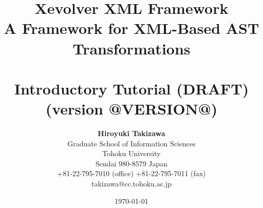 \documentclass[10pt]{book}
\begin{document}
\title{ {\bf {Xevolver XML Framework}}\\
A Framework for XML-Based AST Transformations \\
~\\
\bf{Introductory Tutorial (DRAFT)} \\
{(version @VERSION@)}}

\author{ {\bf Hiroyuki Takizawa} \\
Graduate School of Information Sciences\\
Tohoku University\\
Sendai 980-8579 Japan\\
+81-22-795-7010 (office)  +81-22-795-7011 (fax) \\
takizawa@cc.tohoku.ac.jp
       }
\date{\today}

\maketitle




\tableofcontents







\appendix




\end{document}
